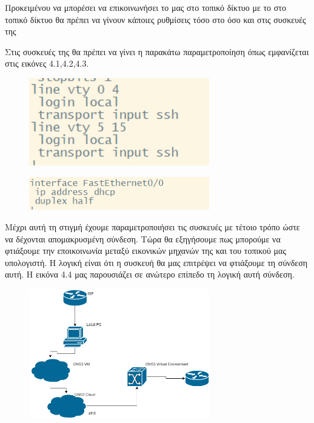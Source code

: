 Προκειμένου να μπορέσει να επικοινωνήσει το  μας στο τοπικό δίκτυο με το  στο τοπικό δίκτυο
θα πρέπει να γίνουν κάποιες ρυθμίσεις τόσο στο  όσο και στις συσκευές της 

Στις συσκευές της  θα πρέπει να γίνει η παρακάτω παραμετροποίηση όπως εμφανίζεται στις εικόνες 4.1,4.2,4.3.

\begin{figure}[htb]
	\centering
	\includegraphics[width=0.7\textwidth]{graphics/cisco_ssh_config.png}
	\caption{ }
\end{figure}

\begin{figure}[htb]
	\centering
	\includegraphics[width=0.7\textwidth]{graphics/dhcp_cisco_config.png}
	\caption{ }
\end{figure}


Μέχρι αυτή τη στιγμή έχουμε παραμετροποιήσει τις συσκευές με τέτοιο τρόπο ώστε να δέχονται
απομακρυσμένη σύνδεση. Τώρα θα εξηγήσουμε πως μπορούμε να φτιάξουμε την εποικοινωνία μεταξύ εικονικών
μηχανών της  και του τοπικού μας υπολογιστή. Η λογική είναι ότι η συσκευή 
θα μας επιτρέψει να φτιάξουμε τη σύνδεση αυτή. Η εικόνα 4.4 μας παρουσιάζει σε ανώτερο επίπεδο τη λογική αυτή σύνδεση.

\begin{figure}[htb]
	\centering
	\includegraphics[width=0.7\textwidth]{graphics/diagram.drawio.png}
	\caption{ }
\end{figure}










